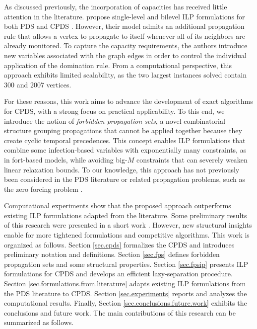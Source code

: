 \documentclass{article}
\begin{document}
As discussed previously, the incorporation of capacities has received little attention in the literature.
\citet{Carvalho2018} propose single-level and bilevel ILP formulations for both PDS and CPDS .
However, their model admits an additional propagation rule that allows a vertex to propagate to itself whenever all of its neighbors are already monitored.
To capture the capacity requirements, the authors introduce new variables associated with the graph edges in order to control the individual application of the 
domination rule.
From a computational perspective, this approach exhibits limited scalability, as the two largest instances solved contain 300 and 2007 vertices.

For these reasons, this work aims to advance the development of exact algorithms for CPDS, with a strong focus on practical applicability.
To this end, we introduce the notion of \emph{forbidden propagation sets}, a novel combinatorial structure grouping propagations that cannot be applied together because they create cyclic temporal precedences.
This concept enables ILP formulations that combine some infection-based variables with exponentially many constraints, as in fort-based models, while avoiding big-$M$ constraints that can severely weaken linear relaxation bounds.
To our knowledge, this approach has not previously been considered in the PDS literature or related propagation problems, such as the zero forcing problem \citep{Bozeman2019}. 

Computational experiments show that the proposed approach outperforms existing ILP formulations adapted from the literature.
Some preliminary results of this research were presented in a short work \citep{Lucci2025}.
However, new structural insights enable for more tightened formulations and competitive algorithms.
This work is organized as follows.
Section \ref{sec.cpds} formalizes the CPDS and introduces preliminary notation and definitions.
Section \ref{sec.fps} defines forbidden propagation sets and some structural properties.
Section \ref{sec.fpsip} presents ILP formulations for CPDS and develops an efficient lazy-separation procedure.
Section \ref{sec.formulations.from.literature} adapts existing ILP formulations from the PDS literature to CPDS.
Section \ref{sec.experiments} reports and analyzes the computational results.
Finally, Section \ref{sec.conclusions.future.work} exhibits the conclusions and future work.
The main contributions of this research can be summarized as follows.
\end{document}
